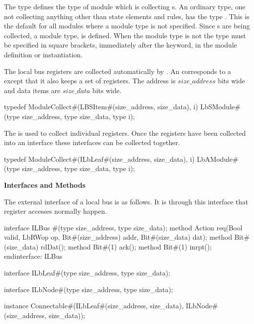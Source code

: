The type  defines the type of module which is collecting
s.  An ordinary type, one not collecting anything other
than state elements and rules, has the type .  This is the
default for all
modules where a module type is not specified. Since s are
being collected, a  module type,  is
defined.  When the  module  type is not  the type must
be specified in square brackets, immediately after the 
keyword, in the module definition or instantiation.

The local bus registers are collected automatically by
.  An 
corresponds  to a
 except that it also keeps a set of registers.
The address is $size\_address$ bits wide and data items are $size\_data$
bits wide.

\begin{libverbatim}
 typedef ModuleCollect#(LBSItem#(size_address, size_data), i) 
         LbSModule#(type size_address, type size_data, type i);
\end{libverbatim}

The  is used to collect individual registers.
Once the registers have been collected into an 
interface these interfaces can be collected together.
\begin{libverbatim}
 typedef ModuleCollect#(ILbLeaf#(size_address, size_data), i)
         LbAModule#(type size_address, type size_data, type i);
\end{libverbatim}



{\bf Interfaces and Methods} 

The external interface of a local bus is as follows.
It is through this interface that register accesses normally happen.
\begin{libverbatim}
 interface ILBus #(type size_address, type size_data);
     method Action req(Bool valid, LbRWop op, Bit#(size_address) addr, 
                       Bit#(size_data) dat);
     method Bit#(size_data) rdDat();
     method Bit#(1) ack();
     method Bit#(1) inrpt();
 endinterface: ILBus
\end{libverbatim}



\begin{libverbatim}
 interface ILbLeaf#(type size_address, type size_data);
\end{libverbatim}
\begin{libverbatim}
 interface ILbNode#(type size_address, type size_data);
\end{libverbatim}
\begin{libverbatim}
 instance Connectable#(ILbLeaf#(size_address, size_data), ILbNode#(size_address, size_data));
\end{libverbatim}






